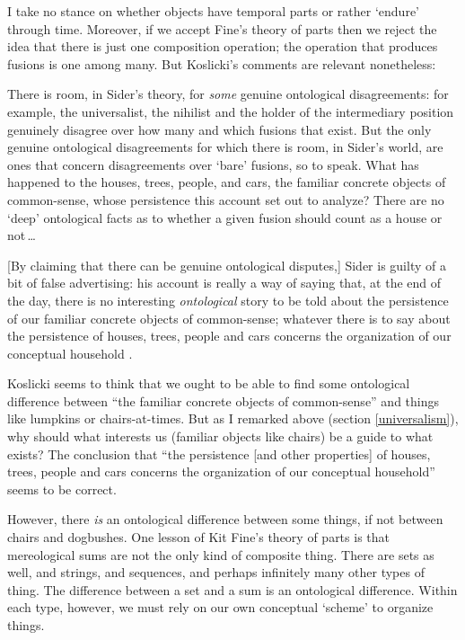 \documentclass[11pt]{article}
\newenvironment{squote}{%
\begin{spacing}{1}
\begin{list}{}{%
\setlength{\labelwidth}{0pt}%
\rightmargin\leftmargin%
}
\item\relax
}{%
\end{list}%
\end{spacing}
}
\begin{document}
\begin{spacing}{1.5}
I take no stance on whether objects have temporal parts or rather
`endure' through time.  Moreover, if we accept Fine's theory of parts
then we reject the idea that there is just one composition operation;
the operation that produces fusions is one among many.  But Koslicki's
comments are relevant nonetheless:

\begin{squote}
There is room, in Sider's theory, for {\em some} genuine ontological
disagreements: for example, the universalist, the nihilist and the
holder of the intermediary position genuinely disagree over how many
and which fusions that exist.  But the only genuine ontological
disagreements for which there is room, in Sider's world, are ones that
concern disagreements over `bare' fusions, so to speak.  What has
happened to the houses, trees, people, and cars, the familiar concrete
objects of common-sense, whose persistence this account set out to
analyze?  There are no `deep' ontological facts as to whether a given
fusion should count as a house or not\,\ldots

[By claiming that there can be genuine ontological disputes,] Sider is
guilty of a bit of false advertising: his account is really a way of
saying that, at the end of the day, there is no interesting {\em
  ontological} story to be told about the persistence of our familiar
concrete objects of common-sense; whatever there is to say about the
persistence of houses, trees, people and cars concerns the
organization of our conceptual household
\citeyearpar[124--125]{koslicki2003}.
\end{squote}

Koslicki seems to think that we ought to be able to find some
ontological difference between ``the familiar concrete objects of
common-sense'' and things like lumpkins or chairs-at-times.  But as I
remarked above (section \ref{universalism}), why should what interests
us (familiar objects like chairs) be a guide to what exists?  The
conclusion that ``the persistence [and other properties] of houses,
trees, people and cars concerns the organization of our conceptual
household'' seems to be correct.

However, there {\em is} an ontological difference between some things,
if not between chairs and dogbushes.  One lesson of Kit Fine's theory
of parts is that mereological sums are not the only kind of composite
thing.  There are sets as well, and strings, and sequences, and
perhaps infinitely many other types of thing.  The difference between
a set and a sum is an ontological difference.  Within each type,
however, we must rely on our own conceptual `scheme' to organize
things.


\end{spacing}
\end{document}
